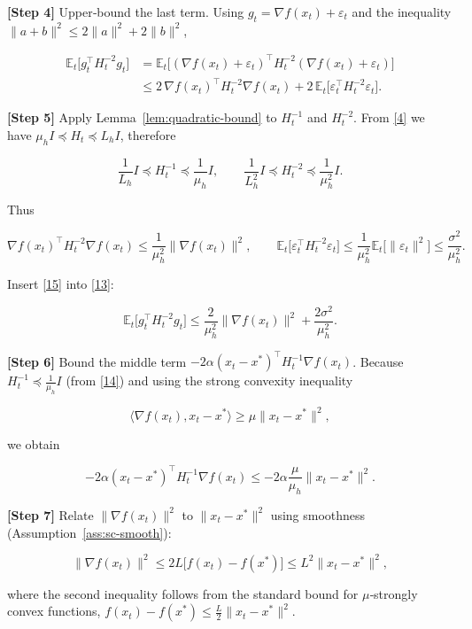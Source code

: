 \documentclass{article}
\newcommand{\E}{\mathbb{E}}
\begin{document}
\noindent\textbf{[Step 4]} Upper‑bound the last term.  Using $g_t=\nabla f(x_t)+\varepsilon_t$ and the inequality $\|a+b\|^{2}\le2\|a\|^{2}+2\|b\|^{2}$,

\[
\begin{aligned}
\E_t\!\bigl[g_t^{\!\top}H_t^{-2}g_t\bigr]
&=\E_t\!\bigl[(\nabla f(x_t)+\varepsilon_t)^{\!\top}H_t^{-2}(\nabla f(x_t)+\varepsilon_t)\bigr] \\
&\le 2\,\nabla f(x_t)^{\!\top}H_t^{-2}\nabla f(x_t)
   +2\,\E_t\!\bigl[\varepsilon_t^{\!\top}H_t^{-2}\varepsilon_t\bigr].
\end{aligned}
\tag{13}
\]

\noindent\textbf{[Step 5]} Apply Lemma~\ref{lem:quadratic-bound} to $H_t^{-1}$ and $H_t^{-2}$.
From \eqref{4} we have $ \mu_{h} I\preceq H_t\preceq L_{h} I$, therefore  

\[
\frac{1}{L_{h}} I\preceq H_t^{-1}\preceq\frac{1}{\mu_{h}} I,
\qquad
\frac{1}{L_{h}^{2}} I\preceq H_t^{-2}\preceq\frac{1}{\mu_{h}^{2}} I .
\tag{14}
\]

Thus  

\[
\nabla f(x_t)^{\!\top}H_t^{-2}\nabla f(x_t)
\le \frac{1}{\mu_{h}^{2}}\|\nabla f(x_t)\|^{2},
\qquad
\E_t\!\bigl[\varepsilon_t^{\!\top}H_t^{-2}\varepsilon_t\bigr]
\le \frac{1}{\mu_{h}^{2}}\E_t\!\bigl[\|\varepsilon_t\|^{2}\bigr]
\le\frac{\sigma^{2}}{\mu_{h}^{2}} .
\tag{15}
\]

Insert \eqref{15} into \eqref{13}:

\[
\E_t\!\bigl[g_t^{\!\top}H_t^{-2}g_t\bigr]
\le
\frac{2}{\mu_{h}^{2}}\|\nabla f(x_t)\|^{2}
+\frac{2\sigma^{2}}{\mu_{h}^{2}} .
\tag{16}
\]

\noindent\textbf{[Step 6]} Bound the middle term $-2\alpha (x_t-x^{*})^{\!\top}H_t^{-1}\nabla f(x_t)$.  
Because $H_t^{-1}\preceq\frac{1}{\mu_{h}}I$ (from \eqref{14}) and using the strong convexity inequality  

\[
\langle \nabla f(x_t),x_t-x^{*}\rangle \ge \mu\|x_t-x^{*}\|^{2},
\tag{17}
\]

we obtain

\[
-2\alpha (x_t-x^{*})^{\!\top}H_t^{-1}\nabla f(x_t)
\le -2\alpha\frac{\mu}{\mu_{h}}\|x_t-x^{*}\|^{2}.
\tag{18}
\]

\noindent\textbf{[Step 7]} Relate $\|\nabla f(x_t)\|^{2}$ to $\|x_t-x^{*}\|^{2}$ using smoothness (Assumption~\ref{ass:sc-smooth}):

\[
\|\nabla f(x_t)\|^{2}
\le 2L\bigl[f(x_t)-f(x^{*})\bigr]
\le L^{2}\|x_t-x^{*}\|^{2},
\tag{19}
\]

where the second inequality follows from the standard bound for $\mu$‑strongly convex functions,
$f(x_t)-f(x^{*})\le\frac{L}{2}\|x_t-x^{*}\|^{2}$.
\end{document}
